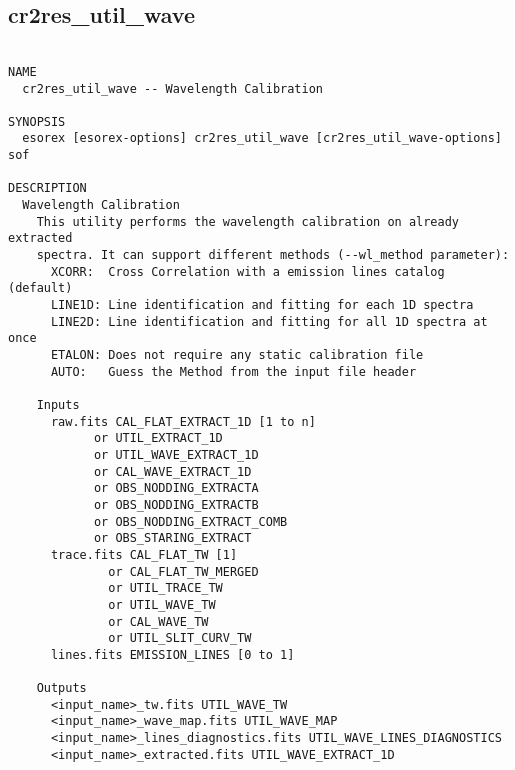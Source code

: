 \subsection{cr2res\_util\_wave}
\begin{verbatim}

NAME
  cr2res_util_wave -- Wavelength Calibration

SYNOPSIS
  esorex [esorex-options] cr2res_util_wave [cr2res_util_wave-options] sof

DESCRIPTION
  Wavelength Calibration                                                  
    This utility performs the wavelength calibration on already extracted 
    spectra. It can support different methods (--wl_method parameter):    
      XCORR:  Cross Correlation with a emission lines catalog (default)   
      LINE1D: Line identification and fitting for each 1D spectra         
      LINE2D: Line identification and fitting for all 1D spectra at once  
      ETALON: Does not require any static calibration file                
      AUTO:   Guess the Method from the input file header                 
                                                                          
    Inputs                                                                
      raw.fits CAL_FLAT_EXTRACT_1D [1 to n]            
            or UTIL_EXTRACT_1D                         
            or UTIL_WAVE_EXTRACT_1D                    
            or CAL_WAVE_EXTRACT_1D                     
            or OBS_NODDING_EXTRACTA                    
            or OBS_NODDING_EXTRACTB                    
            or OBS_NODDING_EXTRACT_COMB                    
            or OBS_STARING_EXTRACT                     
      trace.fits CAL_FLAT_TW [1]                       
              or CAL_FLAT_TW_MERGED                    
              or UTIL_TRACE_TW                         
              or UTIL_WAVE_TW                          
              or CAL_WAVE_TW                           
              or UTIL_SLIT_CURV_TW                     
      lines.fits EMISSION_LINES [0 to 1]               
                                                                          
    Outputs                                                               
      <input_name>_tw.fits UTIL_WAVE_TW
      <input_name>_wave_map.fits UTIL_WAVE_MAP
      <input_name>_lines_diagnostics.fits UTIL_WAVE_LINES_DIAGNOSTICS
      <input_name>_extracted.fits UTIL_WAVE_EXTRACT_1D
                                                                          

\end{verbatim}
